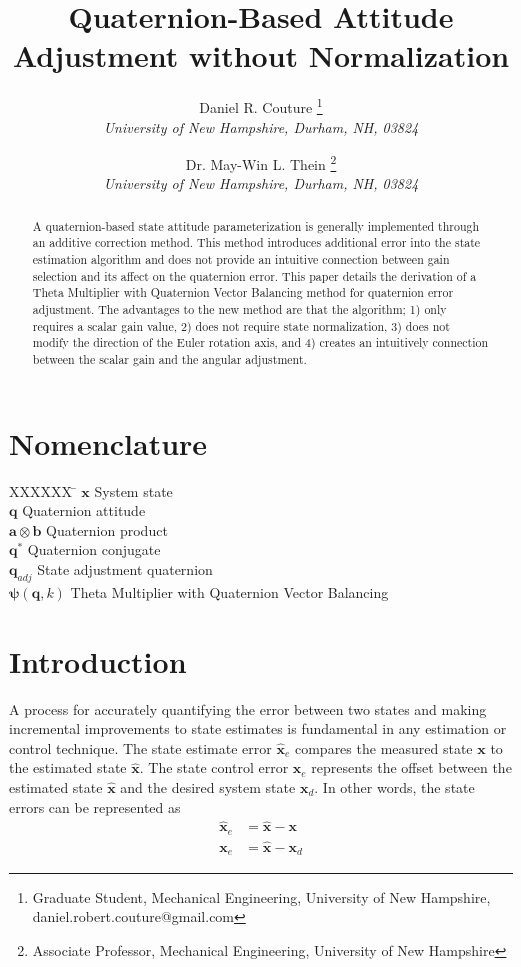 \documentclass[]{aiaa-tc}%
\title{Quaternion-Based Attitude Adjustment without Normalization}
\author{
  Daniel R. Couture%
    \thanks{Graduate Student, Mechanical Engineering, University of New Hampshire, daniel.robert.couture@gmail.com}
  \\
  {\normalsize\itshape
   University of New Hampshire, Durham, NH, 03824}\\
  \and
  Dr. May-Win L. Thein%
   \thanks{Associate Professor, Mechanical Engineering, University of New Hampshire}\\
  {\normalsize\itshape
  University of New Hampshire, Durham, NH, 03824}
 }
\newcommand{\bs}[1]{\boldsymbol{#1}}
\begin{document}
\maketitle

\begin{abstract}
A quaternion-based state attitude parameterization is generally implemented through an additive correction method.  This method introduces additional error into the state estimation algorithm and does not provide an intuitive connection between gain selection and its affect on the quaternion error.  This paper details the derivation of a Theta Multiplier with Quaternion Vector Balancing method for quaternion error adjustment.  The advantages to the new method are that the algorithm; 1) only requires a scalar gain value, 2) does not require state normalization, 3) does not modify the direction of the Euler rotation axis, and 4) creates an intuitively connection between the scalar gain and the angular adjustment.
\end{abstract}

\section*{Nomenclature}

\begin{tabbing}
  XXXXXX \= \kill%
  $\bs{x}$ \> System state \\
  $\bs{q}$ \> Quaternion attitude \\
  $\bs{a} \otimes \bs{b}$ \> Quaternion product \\
  $\bs{q}^*$ \> Quaternion conjugate \\
  $\bs{q}_{adj}$ \> State adjustment quaternion  \\
  $\bs{\psi}(\bs{q}, k)$ \> Theta Multiplier with Quaternion Vector Balancing \\
 \end{tabbing}





\section{Introduction}

A process for accurately quantifying the error between two states and making incremental improvements to state estimates is fundamental in any estimation or control technique.  The state estimate error $\bs{\hat{x}}_e$ compares the measured state $\bs{x}$ to the estimated state $\bs{\hat{x}}$.  The state control error $\bs{x}_e$ represents the offset between the estimated state $\bs{\hat{x}}$ and the desired system state $\bs{x}_d$.  In other words, the state errors can be represented as
\begin{subequations}
  \begin{align}
    \bs{\hat{x}}_e &= \bs{\hat{x}} - \bs{x} \\
    \bs{x}_e &= \bs{\hat{x}} - \bs{x}_d
  \end{align}
  \label{eqn:StateError}
\end{subequations}
\end{document}
